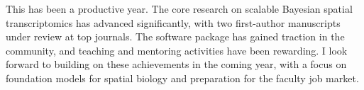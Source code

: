 \documentclass[
    language=english,
    doctype=postdoc-report,
    institution=none,
]{../../omnilatex}
\begin{document}
This has been a productive year. The core research on scalable Bayesian
spatial transcriptomics has advanced significantly, with two first-author
manuscripts under review at top journals. The software package has gained
traction in the community, and teaching and mentoring activities have been
rewarding. I look forward to building on these achievements in the coming
year, with a focus on foundation models for spatial biology and preparation
for the faculty job market.



\end{document}
